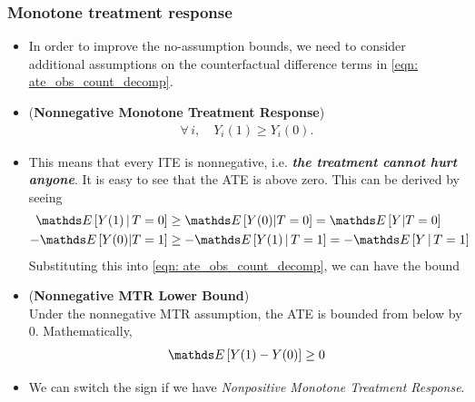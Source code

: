 \documentclass[11pt]{article}
\begin{document}
\subsubsection{Monotone treatment response}
\begin{itemize}
\item In order to improve the no-assumption bounds, we need to consider additional assumptions on the counterfactual difference terms  in \eqref{eqn: ate_obs_count_decomp}.

\item \begin{assumption} (\textbf{Nonnegative Monotone Treatment Response}) \citep{neal2020introduction}\\
\begin{align}
\forall\,i,\quad Y_i(1) \ge Y_i(0). \label{eqn: nonnegative_mtr_assumption}
\end{align}
\end{assumption}

\item This means that every ITE is nonnegative, i.e. \emph{\textbf{the treatment cannot hurt anyone}}. It is easy to see that the ATE is above zero. This can be derived by seeing 
\begin{align*}
\E{}{Y(1) \,|\, T=0}  &\ge \E{}{Y(0) | T=0} = \E{}{Y | T=0} \\
-\E{}{Y(0) | T=1} &\ge- \E{}{Y(1)\,| \, T=1}  =  -\E{}{Y\,| \, T=1}   
\end{align*} Substituting this into \eqref{eqn: ate_obs_count_decomp}, we can have the bound

\item \begin{proposition} (\textbf{Nonnegative MTR Lower Bound})  \citep{neal2020introduction}\\
Under the nonnegative MTR assumption, the ATE is bounded from below by 0. Mathematically,
\begin{align*}
\E{}{Y(1) - Y(0)}  \ge 0
\end{align*}
\end{proposition}

\item We can switch the sign if we have \emph{Nonpositive Monotone Treatment Response}.
\end{itemize}
\end{document}
